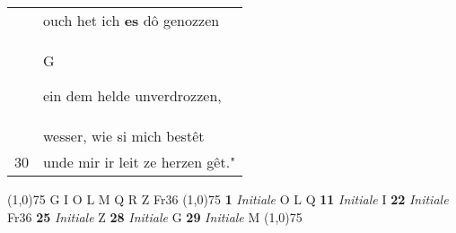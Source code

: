 \documentclass[8pt,a4paper,notitlepage]{article}
\begin{document}
\begin{table}[ht]
\begin{minipage}[t]{0.5\linewidth}
\begin{tabular}{rl}
 & ouch het ich \textbf{es} dô genozzen\\ 
 & \begin{large}G\end{large}ein dem helde unverdrozzen,\\ 
 & wesser, wie si mich bestêt\\ 
30 & unde mir ir leit ze herzen gêt."\\ 
\end{tabular}
\scriptsize
\line(1,0){75} \newline
G I O L M Q R Z Fr36 \newline
\line(1,0){75} \newline
\textbf{1} \textit{Initiale} O L Q  \textbf{11} \textit{Initiale} I  \textbf{22} \textit{Initiale} Fr36  \textbf{25} \textit{Initiale} Z  \textbf{28} \textit{Initiale} G  \textbf{29} \textit{Initiale} M  \newline
\line(1,0){75} \newline

\end{minipage}
\end{table}
\end{document}
